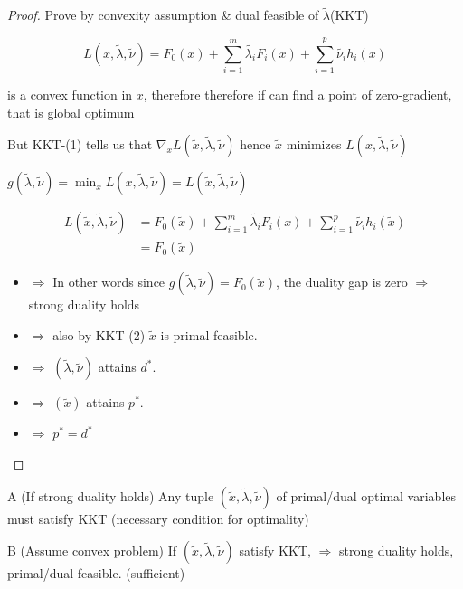 \begin{proof}
	Prove by convexity assumption \& dual feasible of $\tilde{\lambda}$(KKT)
	
	\begin{equation*}
	L(x,\tilde{\lambda}, \tilde{\nu}) = F_0(x) + \sum^m_{i=1}\tilde{\lambda_i}F_i(x) + \sum^p_{i=1}\tilde{\nu_i}h_i(x)
	\end{equation*}
	
	is a convex function in $x$, therefore therefore if can find a point of zero-gradient, that is global optimum
	
	But KKT-(1) tells us that $\nabla_xL(\tilde{x},\tilde{\lambda},\tilde{\nu})$ hence $\tilde{x}$ minimizes $L(x,\tilde{\lambda},\tilde{\nu})$
	
	$g(\tilde{\lambda}, \tilde{\nu}) = \min_xL(x,\tilde{\lambda},\tilde{\nu}) = L(\tilde{x},\tilde{\lambda},\tilde{\nu})$
	
	
	\begin{align*}
	L(\tilde{x},\tilde{\lambda},\tilde{\nu}) &= F_0(\tilde{x}) + \sum^m_{i=1}\tilde{\lambda_i}F_i(x) + \sum^p_{i=1}\tilde{\nu_i}h_i(\tilde{x})\\
	&= F_0(\tilde{x})
	\end{align*}
	
	\begin{itemize}
		\item $\Rightarrow$ In other words since $g(\tilde{\lambda},\tilde{\nu}) = F_0(\tilde{x})$, the duality gap is zero $\Rightarrow$ strong duality holds
		
		\item $\Rightarrow$ also by KKT-(2) $\tilde{x}$ is primal feasible.
		
		\item $\Rightarrow$ $(\tilde{\lambda},\tilde{\nu})$ attains $d^*$.
		
		\item $\Rightarrow$ $(\tilde{x})$ attains $p^*$.
		
		\item $\Rightarrow$ $p^* = d^*$
	\end{itemize}
\end{proof}

\begin{theorem}{A}
	(If strong duality holds) Any tuple $(\tilde{x},\tilde{\lambda},\tilde{\nu})$ of primal/dual optimal variables must satisfy KKT (necessary condition for optimality)
\end{theorem}

\begin{theorem}{B}
	(Assume convex problem) If $(\tilde{x},\tilde{\lambda},\tilde{\nu})$ satisfy KKT, $\Rightarrow$ strong duality holds, primal/dual feasible. (sufficient)
\end{theorem}

